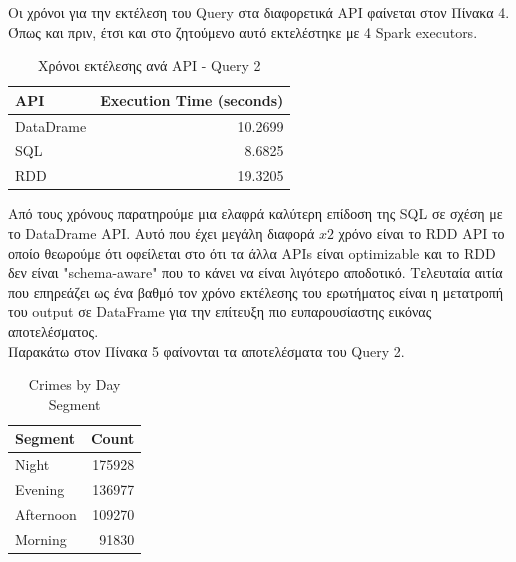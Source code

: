 \documentclass{article}
\begin{document}
Οι χρόνοι για την εκτέλεση του  Query στα διαφορετικά API φαίνεται στον Πίνακα 4. Όπως και πριν, έτσι και στο ζητούμενο αυτό εκτελέστηκε με 4 Spark executors. 

\begin{table}[h]
\centering
\begin{tabular}{|l|r|}
\hline
\textbf{API} & \textbf{Execution Time (seconds)} \\ \hline
DataDrame            & 10.2699                           \\ \hline
SQL           & 8.6825                            \\ \hline
RDD           & 19.3205                          \\ \hline
\end{tabular}
\caption{ Χρόνοι εκτέλεσης ανά API - Query 2}
\label{table:query_execution_times}
\end{table}

Από τους χρόνους παρατηρούμε μια ελαφρά καλύτερη επίδοση της  SQL  σε σχέση με το  DataDrame API. Αυτό που έχει μεγάλη διαφορά \(x2\) χρόνο είναι το  RDD API  το οποίο θεωρούμε ότι οφείλεται στο ότι τα άλλα  APIs  είναι optimizable  και το  RDD  δεν είναι  "schema-aware"  που το κάνει να είναι λιγότερο αποδοτικό. Τελευταία αιτία που επηρεάζει ως ένα βαθμό τον χρόνο εκτέλεσης του ερωτήματος είναι η μετατροπή του  output  σε  DataFrame  για την επίτευξη πιο ευπαρουσίαστης εικόνας αποτελέσματος. \\


Παρακάτω στον Πίνακα 5 φαίνονται τα αποτελέσματα του   Query 2. 

\begin{table}[h]
\centering
\begin{tabular}{|l|r|}
\hline
Segment   & Count  \\ \hline
Night     & 175928 \\ \hline
Evening   & 136977 \\ \hline
Afternoon & 109270 \\ \hline
Morning   & 91830  \\ \hline
\end{tabular}
\caption{Crimes by Day Segment}
\label{table:segment_count}
\end{table}
\end{document}
